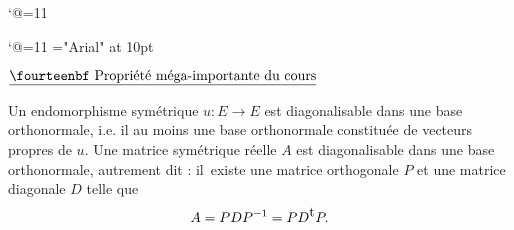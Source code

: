 \catcode`@=11\relax
\def\Api{Mathematicon@Api}%





\catcode`@=11\relax
\font\LD@Font@Arial="Arial" at 10pt
\newcount\LD@Count@Temp
\def\LD@Exercice@Display@Code{}%
\def\LD@Exercice@Display@Code@Post{%
	\ifcsname LD@Exo@@Solution\endcsname
		\unless\ifx\LD@Exo@@Solution\LD@Empty
			\pn{\eightpts Solution : \eightpts \LD@Exo@@Solution}%
		\fi
	\fi
}%
\def\LD@Display#1{%
	\LD@Count@Temp=#1\relax
	\ifcase\LD@Count@Temp
	\or
	Math. Sup.
	\or
	Math. Sp\'e
	\else
	\fi
}%
\newcount\LD@Exo@Total{}\relax

\vglue-10mm%
\bigskip

%
\bigskip

%
\bigskip

%
\bigskip

%

\bigskip
\centerline{$\underline{\hbox{\fourteenbf Propri\'et\'e m\'ega-importante du cours}}$}%
\bigskip

\noindent
Un endomorphisme sym\'etrique $u:E\to E$ est diagonalisable dans une base orthonormale, i.e. 
il au moins une base orthonormale constitu\'ee de vecteurs propres de $u$. 
\medskip
\noindent
Une matrice sym\'etrique r\'eelle $A$ est diagonalisable dans  une base orthonormale, autrement dit :  il~existe une matrice orthogonale $P$ et une matrice diagonale $D$ telle que 
$$
A=PDP^{-1}=PD^{\hbox{\rm t}}P. 
$$


%
\bigskip

%
\bigskip
\bye